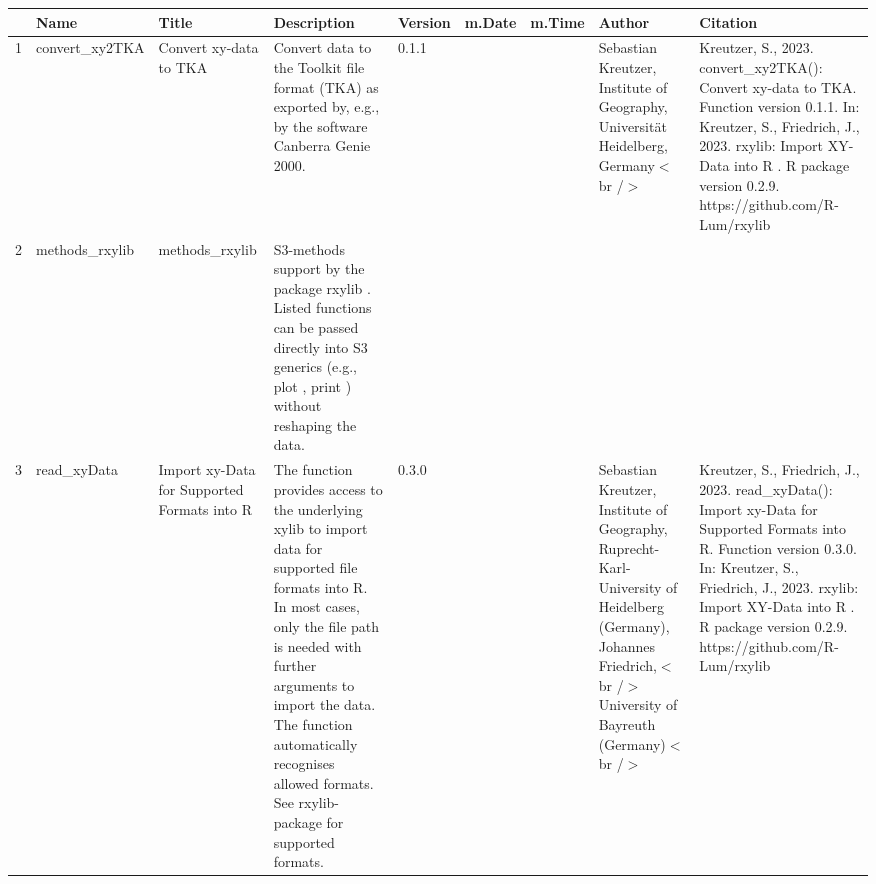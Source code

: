 \begin{table}[ht]
\centering
\begin{tabular}{rllllllll}
  \hline
 & Name & Title & Description & Version & m.Date & m.Time & Author & Citation \\ 
  \hline
1 & convert\_xy2TKA & Convert xy-data to TKA & Convert data to the Toolkit file format (TKA) as exported by, e.g., by the software Canberra Genie 2000. & 0.1.1
 &  &  & Sebastian Kreutzer, Institute of Geography, Universität Heidelberg, Germany$<$br /$>$ & Kreutzer, S., 2023. convert\_xy2TKA(): Convert xy-data to TKA. Function version 0.1.1. In: Kreutzer, S., Friedrich, J., 2023. rxylib: Import XY-Data into R . R package version 0.2.9. https://github.com/R-Lum/rxylib
 \\ 
  2 & methods\_rxylib & methods\_rxylib & S3-methods support by the package  rxylib . Listed functions can be passed directly into S3 generics (e.g.,  plot ,  print ) without reshaping the data. &  &  &  &  &  \\ 
  3 & read\_xyData & Import xy-Data for Supported Formats into R & The function provides access to the underlying  xylib  to import data for supported file formats into R. In most cases, only the file path is needed with further arguments to import the data. The function automatically recognises allowed formats. See  rxylib-package  for supported formats. & 0.3.0
 &  &  & Sebastian Kreutzer, Institute of Geography, Ruprecht-Karl-University of Heidelberg (Germany), Johannes Friedrich,$<$br /$>$ University of Bayreuth (Germany)$<$br /$>$ & Kreutzer, S., Friedrich, J., 2023. read\_xyData(): Import xy-Data for Supported Formats into R. Function version 0.3.0. In: Kreutzer, S., Friedrich, J., 2023. rxylib: Import XY-Data into R . R package version 0.2.9. https://github.com/R-Lum/rxylib
 \\ 
   \hline
\end{tabular}
\end{table}

